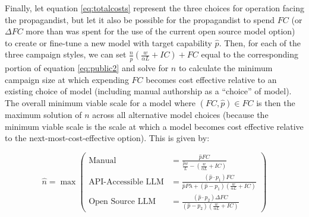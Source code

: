 \documentclass{article}
\begin{document}
Finally, let equation \ref{eq:totalcosts} represent the three choices for operation facing the propagandist, but let it also be possible for the propagandist to spend $FC$ (or $\Delta FC$ more than was spent for the use of the current open source model option) to create or fine-tune a new model with target capability $\hat{p}$. Then, for each of the three campaign styles, we can set $\frac{n}{\hat{p}} \left( \frac{w}{\alpha L} + IC \right) + FC$ equal to the corresponding portion of equation \ref{eq:public2} and solve for $n$ to calculate the minimum campaign size at which expending $FC$ becomes cost effective relative to an existing choice of model (including manual authorship as a ``choice'' of model). The overall minimum viable scale for a model where $(FC, \hat{p}) \in FC$ is then the maximum solution of $n$ across all alternative model choices (because the minimum viable scale is the scale at which a model becomes cost effective relative to the next-most-cost-effective option). This is given by:

\begin{equation}
  \hat{n} = \max \left(
    \begin{aligned}
      \text{Manual} &= \frac{\hat{p} FC}{\frac{\hat{p} w}{L} - \left( \frac{w}{\alpha L} + IC \right)} \\
      \text{API-Accessible LLM} &= \frac{(\hat{p} \cdot p_1) FC}{\hat{p} P \lambda + (\hat{p} - p_1) \left( \frac{w}{\alpha L} + IC \right)} \\
      \text{Open Source LLM} &= \frac{(\hat{p} \cdot p_2) \Delta FC}{(\hat{p} - p_2) \left( \frac{w}{\alpha L} + IC \right)}
    \end{aligned}
  \right)
\end{equation}
\end{document}
